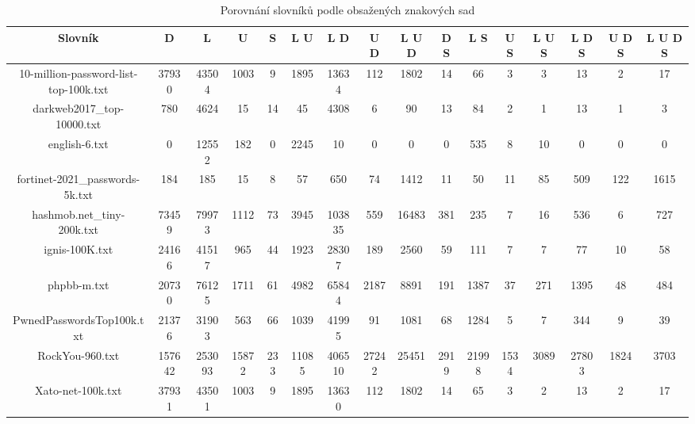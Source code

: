 \begin{table}[h]
  \centering
  \begin{tabular}{|c|c|c|c|c|c|c|c|c|c|c|c|c|c|c|c|}
  \hline
      Slovník & D & L & U & S & L U & L D & U D & L U D & D S & L S & U S & L U S & L D S & U D S & L U D S\\ \hline
      10-million-password-list-top-100k.txt & 37930 & 43504 & 1003 & 9 & 1895 & 13634 & 112 & 1802 & 14 & 66 & 3 & 3 & 13 & 2 & 17\\
      darkweb2017\_top-10000.txt & 780 & 4624 & 15 & 14 & 45 & 4308 & 6 & 90 & 13 & 84 & 2 & 1 & 13 & 1 & 3\\
      english-6.txt & 0 & 12552 & 182 & 0 & 2245 & 10 & 0 & 0 & 0 & 535 & 8 & 10 & 0 & 0 & 0\\
      fortinet-2021\_passwords-5k.txt & 184 & 185 & 15 & 8 & 57 & 650 & 74 & 1412 & 11 & 50 & 11 & 85 & 509 & 122 & 1615\\
      hashmob.net\_tiny-200k.txt & 73459 & 79973 & 1112 & 73 & 3945 & 103835 & 559 & 16483 & 381 & 235 & 7 & 16 & 536 & 6 & 727\\
      ignis-100K.txt & 24166 & 41517 & 965 & 44 & 1923 & 28307 & 189 & 2560 & 59 & 111 & 7 & 7 & 77 & 10 & 58\\
      phpbb-m.txt & 20730 & 76125 & 1711 & 61 & 4982 & 65844 & 2187 & 8891 & 191 & 1387 & 37 & 271 & 1395 & 48 & 484\\
      PwnedPasswordsTop100k.txt & 21376 & 31903 & 563 & 66 & 1039 & 41995 & 91 & 1081 & 68 & 1284 & 5 & 7 & 344 & 9 & 39\\
      RockYou-960.txt & 157642 & 253093 & 15872 & 233 & 11085 & 406510 & 27242 & 25451 & 2919 & 21998 & 1534 & 3089 & 27803 & 1824 & 3703\\
      Xato-net-100k.txt & 37931 & 43501 & 1003 & 9 & 1895 & 13630 & 112 & 1802 & 14 & 65 & 3 & 2 & 13 & 2 & 17\\
      \hline
  \end{tabular}
  \caption{Porovnání slovníků podle obsažených znakových sad} \label{tabulka2}
\end{table}